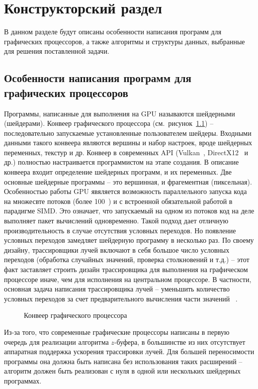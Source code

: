 \chapter{Конструкторский раздел}

В данном разделе будут описаны особенности написания программ для
графических процессоров, а также алгоритмы и структуры данных,
выбранные для решения поставленной задачи.

\section{Особенности написания программ для графических процессоров}

Программы, написанные для выполнения на GPU называются шейдерными (шейдерами).
Конвеер графического процессора (см.~рисунок~\ref{img:pipeline}) -- 
последовательно запускаемые установленные пользователем 
шейдеры. Входными данными такого конвеера являются вершины и набор
настроек, вроде шейдерных переменных, текстур и др.
Конвеер в современных API (Vulkan~\cite{Vulkan}, DirectX12~\cite{DirectX12} и др.) 
полностью настраивается 
программистом на этапе создания. В описание конвеера входит определение
шейдерных программ, и их переменных. Две основные шейдерные
программы -- это вершинная, и фрагементная (пиксельная). 
Особенностью работы GPU явяляется возможность параллельного запуска 
кода на множесвте потоков (более 100~\cite{ACLaG}) и с встроенной обязательной работой 
в парадигме SIMD. Это означает, что запускаемый на одном из потоков код
на деле выполняет пакет вычислений одновременно. Такой подход дает 
отличную производительность в случае отсутствия условных переходов. Но 
появление условных переходов замедляет шейдерную программу в несколько раз.
По своему дизайну, трассировщики лучей включают в себя большое число условных
переходов (обработка случайных значений, проверка столкновений и т.д.) -- 
этот факт заставляет строить дизайн трассировщика для выполнения на графическом
процессоре иначе, чем для исполнения на центральном процессоре. В частности,
основная задача написания трассировщика лучей -- уменьшить количество 
условных переходов за счет предварительного вычисления части значений
~\cite{Vulkan}.

\begin{figure}[H]
  \centering
  
  \caption{Конвеер графического процессора~\cite{VulkanTut}}
  \label{img:pipeline}
\end{figure}

Из-за того, что современные графические процессоры написаны в первую очередь
для реализации алгоритма $z$-буфера, в большинстве из них
отсутствует аппаратная поддержка ускорения трассировки лучей. Для большей переносимости программы она должна быть написана без использования таких расширений -- алгоритм 
должен быть реализован с нуля в одной или нескольких шейдерных программах.


